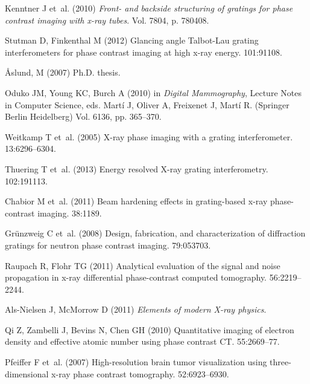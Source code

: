 \documentclass{pnastwo}
\begin{document}
\begin{article}
\begin{thebibliography}{10}
Kenntner J et~al. (2010) {\em {Front- and backside structuring of gratings for
  phase contrast imaging with x-ray tubes}}.
\newblock Vol.{} 7804, p. 780408.

Stutman D, Finkenthal M (2012) {Glancing angle Talbot-Lau grating
  interferometers for phase contrast imaging at high x-ray energy}.
 101:91108.

{\AA slund, M} (2007) Ph.D. thesis.

Oduko JM, Young KC, Burch A (2010) in {\em Digital Mammography}, Lecture Notes
  in Computer Science, eds.{} Martí J, Oliver A, Freixenet J, Martí R.
\newblock (Springer Berlin Heidelberg) Vol.{} 6136, pp. 365--370.

Weitkamp T et~al. (2005) {X-ray phase imaging with a grating interferometer}.
 13:6296--6304.

Thuering T et~al. (2013) {Energy resolved X-ray grating interferometry}.
 102:191113.

Chabior M et~al. (2011) {Beam hardening effects in grating-based x-ray
  phase-contrast imaging}.
 38:1189.

Gr\"{u}nzweig C et~al. (2008) {Design, fabrication, and characterization of
  diffraction gratings for neutron phase contrast imaging.}
 79:053703.

Raupach R, Flohr TG (2011) {Analytical evaluation of the signal and noise
  propagation in x-ray differential phase-contrast computed tomography.}
 56:2219--2244.

\end{thebibliography}
\begin{thebibliography}{10}

Als-Nielsen J, McMorrow D (2011) {\em {Elements of modern X-ray physics}}.

Qi Z, Zambelli J, Bevins N, Chen GH (2010) {Quantitative imaging of electron
  density and effective atomic number using phase contrast CT.}
 55:2669--77.

Pfeiffer F et~al. (2007) {High-resolution brain tumor visualization using
  three-dimensional x-ray phase contrast tomography.}
 52:6923--6930.


\end{thebibliography}
\end{article}
\end{document}
